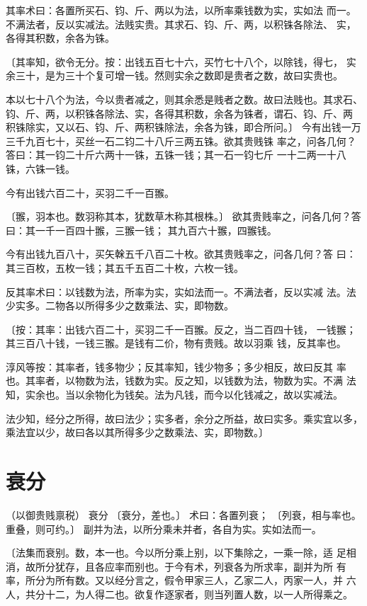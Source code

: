 \documentclass[a4paper,12pt,UTF8,twoside]{ctexbook}
\begin{document}
其率术曰：各置所买石、钧、斤、两以为法，以所率乘钱数为实，实如法 而一。不满法者，反以实减法。法贱实贵。其求石、钧、斤、两，以积铢各除法、 实，各得其积数，余各为铢。

〔其率知，欲令无分。按：出钱五百七十六，买竹七十八个，以除钱，得七， 实余三十，是为三十个复可增一钱。然则实余之数即是贵者之数，故曰实贵也。

本以七十八个为法，今以贵者减之，则其余悉是贱者之数。故曰法贱也。其求石、 钧、斤、两，以积铢各除法、实，各得其积数，余各为铢者，谓石、钧、斤、两 积铢除实，又以石、钧、斤、两积铢除法，余各为铢，即合所问。〕 今有出钱一万三千九百七十，买丝一石二钧二十八斤三两五铢。欲其贵贱铢 率之，问各几何？答曰：其一钧二十斤六两十一铢，五铢一钱；其一石一钧七斤 一十二两一十八铢，六铢一钱。

今有出钱六百二十，买羽二千一百翭。

〔翭，羽本也。数羽称其本，犹数草木称其根株。〕 欲其贵贱率之，问各几何？答曰：其一千一百四十翭，三翭一钱； 其九百六十翭，四翭钱。

今有出钱九百八十，买矢榦五千八百二十枚。欲其贵贱率之，问各几何？答 曰：其三百枚，五枚一钱；其五千五百二十枚，六枚一钱。

反其率术曰：以钱数为法，所率为实，实如法而一。不满法者，反以实减 法。法少实多。二物各以所得多少之数乘法、实，即物数。

〔按：其率：出钱六百二十，买羽二千一百翭。反之，当二百四十钱， 一钱翭；其三百八十钱，一钱三翭。是钱有二价，物有贵贱。故以羽乘 钱，反其率也。

淳风等按：其率者，钱多物少；反其率知，钱少物多；多少相反，故曰反其 率也。其率者，以物数为法，钱数为实。反之知，以钱数为法，物数为实。不满 法知，实余也。当以余物化为钱矣。法为凡钱，而今以化钱减之，故以实减法。

法少知，经分之所得，故曰法少；实多者，余分之所益，故曰实多。乘实宜以多， 乘法宜以少，故曰各以其所得多少之数乘法、实，即物数。〕

\chapter{衰分}
（以御贵贱禀税） 衰分 〔衰分，差也。〕 术曰：各置列衰； 〔列衰，相与率也。重叠，则可约。〕 副并为法，以所分乘未并者，各自为实。实如法而一。

〔法集而衰别。数，本一也。今以所分乘上别，以下集除之，一乘一除，适 足相消，故所分犹存，且各应率而别也。于今有术，列衰各为所求率，副并为所 有率，所分为所有数。又以经分言之，假令甲家三人，乙家二人，丙家一人，并 六人，共分十二，为人得二也。欲复作逐家者，则当列置人数，以一人所得乘之。
\end{document}
